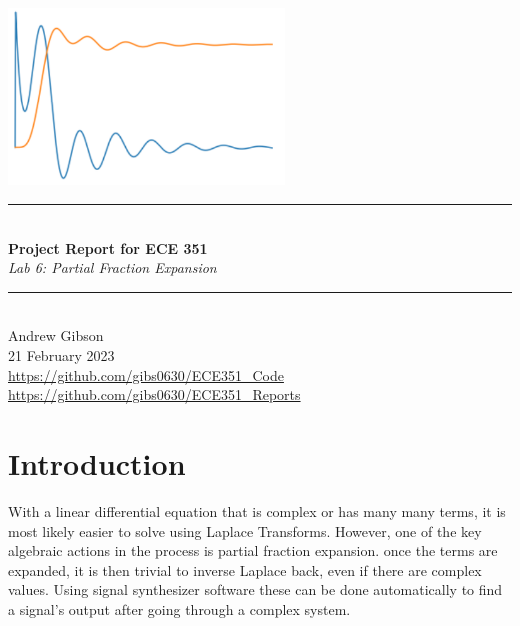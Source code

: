 \documentclass[12pt,a4paper]{article}
\newcommand{\HRule}{\rule{\linewidth}{0.5mm}}
\begin{document}
\begin{titlepage}
\begin{center}
\includegraphics[width=0.55\textwidth]{titlepage_image.png}~\\[2cm]
\HRule \\[0.4cm]
{ \LARGE 
  \textbf{Project Report for ECE 351}\\[0.4cm]
  \emph{Lab 6: Partial Fraction Expansion}\\[0.4cm]
}
\HRule \\[1.5cm]
{ \large
  Andrew Gibson \\[0.1cm]
 21 February 2023\\[0.1cm]
  \url{https://github.com/gibs0630/ECE351\_Code}\\[0.1cm]
  \url{https://github.com/gibs0630/ECE351\_Reports}\\[0.1cm]
}
\vfill
{\large }
 
\end{center}
\end{titlepage}
\newpage
\tableofcontents
{}
\newpage
\setcounter{page}{1}
\section{Introduction}\label{sec:intro}
With a linear differential equation that is complex or has many many terms, it is most likely easier to solve using Laplace Transforms.
However, one of the key algebraic actions in the process is partial fraction expansion.  once the terms are expanded, it is then trivial to inverse Laplace back, even if there are complex values. Using signal synthesizer software these can be done automatically to find a signal's output after going through a complex system.
\end{document}
